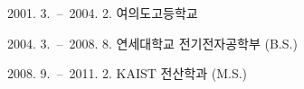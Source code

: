 \documentclass[master,english,final]{kaist-ucs}
\begin{document}


%
\curriculumvitae[korean]

    \begin{personaldata}
        \address    {서울특별시 영등포구 여의도동 대교아파트 5동 1213호}
    \end{personaldata}

    \begin{education}
        \item[2001. 3.\ --\ 2004. 2.] 여의도고등학교
        \item[2004. 3.\ --\ 2008. 8.] 연세대학교 전기전자공학부 (B.S.)
        \item[2008. 9.\ --\ 2011. 2.] KAIST 전산학과 (M.S.)
    \end{education}


\end{document}
